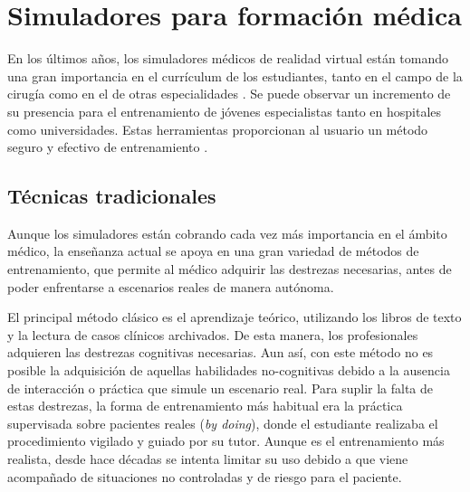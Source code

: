 \section{Simuladores para formación médica}
\label{art:medicalsim}

En los últimos años, los simuladores médicos de realidad virtual están tomando una gran importancia en el currículum de los estudiantes, tanto en el campo de la cirugía como en el de otras especialidades \cite{PATEL2017266.e7}. Se puede observar un incremento de su presencia para el entrenamiento de jóvenes especialistas tanto en hospitales como universidades. Estas herramientas proporcionan al usuario un método seguro y efectivo de entrenamiento \cite{simsafety}.

\subsection{Técnicas tradicionales}

Aunque los simuladores están cobrando cada vez más importancia en el ámbito médico, la enseñanza actual se apoya en una gran variedad de métodos de entrenamiento, que permite al médico adquirir las destrezas necesarias, antes de poder enfrentarse a escenarios reales de manera autónoma. 


El principal método clásico es el aprendizaje teórico, utilizando los libros de texto y la lectura de casos clínicos archivados. 
De esta manera, los profesionales adquieren las destrezas cognitivas necesarias. Aun así, con este método no es posible la adquisición de aquellas habilidades no-cognitivas debido a la ausencia de interacción o práctica que simule un escenario real. 
Para suplir la falta de estas destrezas, la forma de entrenamiento más habitual era la práctica supervisada sobre pacientes reales (\emph{by doing}), donde el estudiante realizaba el procedimiento vigilado y guiado por su tutor. Aunque es el entrenamiento más realista, desde hace décadas se intenta limitar su uso debido a que viene acompañado de situaciones no controladas y de riesgo para el paciente. %

